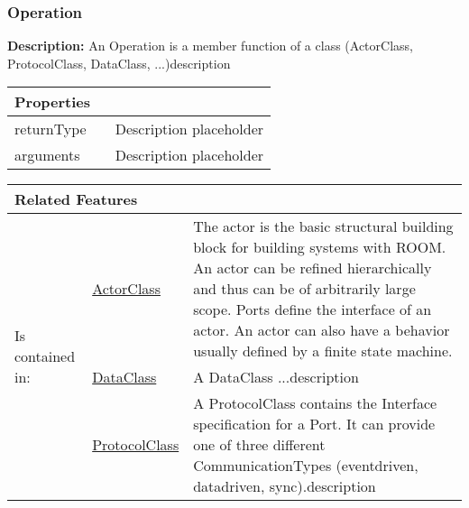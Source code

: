		\subsubsection{\huge Operation}
			\hypertarget{ref:Operation}{}
			
			\textbf{Description:} An Operation is a member function of a class (ActorClass, ProtocolClass, DataClass, ...)description 
			
			\begingroup
			\renewcommand{\arraystretch}{1.8} %
			\begin{longtable}{p{2.5cm}p{4cm} p{}}
				\multicolumn{2}{l}{\textbf{\large Properties}} \\
				\hline
			\tabitem returnType &  & Description placeholder\\
			\tabitem arguments &  & Description placeholder\\
			\end{longtable}
			\endgroup
			
			
			\begingroup
			\renewcommand{\arraystretch}{1.8} %
			\begin{longtable}{p{2.5cm}|p{4cm} p{}}
				\multicolumn{2}{l}{\textbf{\large Related Features}} & \\
				\hline
			\multirow{3}{*}{Is contained in:} & \tabitem \hyperlink{ref:ActorClass}{ActorClass}  & The actor is the basic structural building block for building systems with ROOM. An actor can be refined hierarchically and thus can be of arbitrarily large scope. Ports define the interface of an actor. An actor can also have a behavior usually defined by a finite state machine. \\
			& \tabitem \hyperlink{ref:DataClass}{DataClass}  & A DataClass ...description  \\
			& \tabitem \hyperlink{ref:ProtocolClass}{ProtocolClass}  & A ProtocolClass contains the Interface specification for a Port. It can provide one of three different CommunicationTypes (eventdriven, datadriven, sync).description  \\
			\hline
			\end{longtable}
			\endgroup
			
			
			
		\vspace{\baselineskip}
		\vspace{\baselineskip}
		\vspace{\baselineskip}
		
